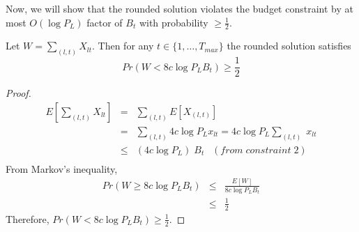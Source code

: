 \noindent

\medskip
\noindent
Now, we will show that the rounded solution violates the budget constraint by at most $O(\log P_L)$ factor of $B_t$ with probability $\geq \frac{1}{2}$.

\noindent
\begin{claim}
Let $W = \sum_{(l,t)} X_{lt}$. Then for any $t \in \{1,\ldots,T_{max}\}$ the rounded solution satisfies
\begin{equation}
    Pr(W <  8c \log P_L B_t) \geq \frac{1}{2}
\end{equation}
\end{claim}
\begin{proof}
\begin{eqnarray*}
  E[\sum_{(l,t)} X_{lt}] &= & \sum_{(l,t)} E[X_{(l,t)}] \\
  & = & \sum_{(l,t)} 4c \log P_L x_{lt} =  4c \log P_L \sum_{(l,t)} \; x_{lt} \\
  & \leq & (4c\log P_L) \; B_t \enspace \; (from \; constraint \; 2) \\
\end{eqnarray*}
From Markov's inequality,
\begin{eqnarray*}
    Pr(W \geq 8c\log P_L B_t) &\leq& \frac{E[W]}{8c \log P_L B_t} \\ 
    & \leq & \frac{1}{2}
\end{eqnarray*}
Therefore, $Pr(W < 8c\log P_L B_t) \geq \frac{1}{2}$.
\end{proof}
